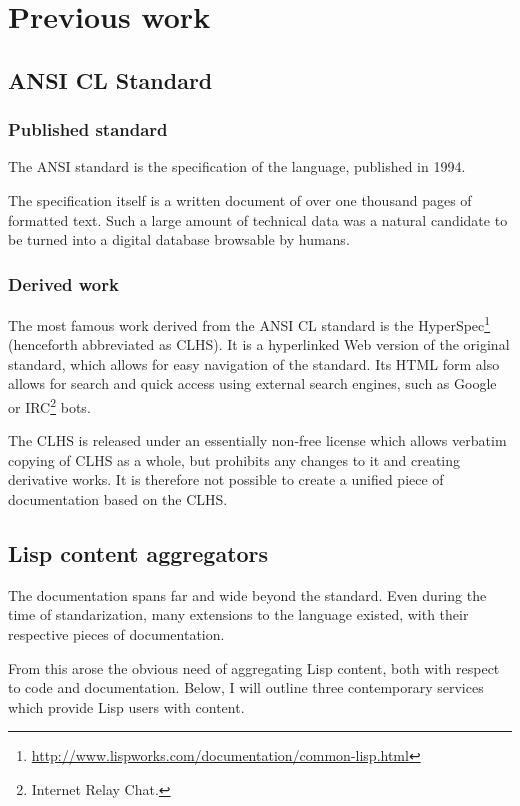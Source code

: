 \section{Previous work}

\subsection{ANSI CL Standard}

\subsubsection{Published standard}

The ANSI \cl{} standard\cite{ANSI:1994:standard} is the specification of the \cl{} language, published in 1994.

The specification itself is a written document of over one thousand pages of formatted text. Such a large amount of technical data was a natural candidate to be turned into a digital database browsable by humans.
\subsubsection{Derived work}
The most famous work derived from the ANSI CL standard is the \cl{} HyperSpec\footnote{\url{http://www.lispworks.com/documentation/common-lisp.html}} (henceforth abbreviated as CLHS). It is a hyperlinked Web version of the original standard, which allows for easy navigation of the standard. Its HTML form also allows for search and quick access using external search engines, such as Google or IRC\footnote{Internet Relay Chat.} bots.

The CLHS is released under an essentially non-free license which allows verbatim copying of CLHS as a whole, but prohibits any changes to it and creating derivative works. It is therefore not possible to create a unified piece of \cl{} documentation based on the CLHS.

\subsection{Lisp content aggregators}

The \cl{} documentation spans far and wide beyond the \cl{} standard. Even during the time of \cl{} standarization, many extensions to the language existed, with their respective pieces of documentation.

From this arose the obvious need of aggregating Lisp content, both with respect to code and documentation. Below, I will outline three contemporary services which provide Lisp users with content.

